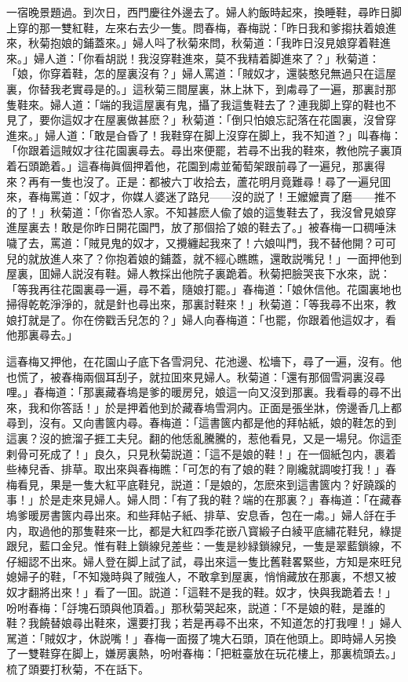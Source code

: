 一宿晚景題過。到次日，西門慶往外邊去了。婦人約飯時起來，換睡鞋，尋昨日脚上穿的那一雙紅鞋，左來右去少一隻。問春梅，春梅説：「昨日我和爹搊扶着娘進來，秋菊抱娘的鋪蓋來。」婦人呌了秋菊來問，秋菊道：「我昨日沒見娘穿着鞋進來。」婦人道：「你看胡説！我沒穿鞋進來，莫不我精着脚進來了？」秋菊道：「娘，你穿着鞋，怎的屋裏沒有？」婦人罵道：「賊奴才，還裝憨兒無過只在這屋裏，你替我老實尋是的。」這秋菊三間屋裏，牀上牀下，到䖏尋了一遍，那裏討那隻鞋來。婦人道：「端的我這屋裏有鬼，攝了我這隻鞋去了？連我脚上穿的鞋也不見了，要你這奴才在屋裏做甚麽？」秋菊道：「倒只怕娘忘記落在花園裏，沒曾穿進來。」婦人道：「敢是㒲昏了！我鞋穿在脚上沒穿在脚上，我不知道？」叫春梅：「你跟着這賊奴才往花園裏尋去。尋出來便罷，若尋不出我的鞋來，教他院子裏頂着石頭跪着。」這春梅眞個押着他，花園到䖏並葡萄架跟前尋了一遍兒，那裏得來？再有一隻也沒了。正是：都被六丁收拾去，蘆花明月竟難尋！尋了一遍兒囬來，春梅罵道：「奴才，你媒人婆迷了路兒——沒的説了！王嬤嬤賣了磨——推不的了！」秋菊道：「你省恐人家。不知甚麽人偸了娘的這隻鞋去了，我沒曾見娘穿進屋裏去！敢是你昨日開花園門，放了那個拾了娘的鞋去了。」被春梅一口稠唾沬噦了去，罵道：「賊見鬼的奴才，又攪纏起我來了！六娘叫門，我不替他開？可可兒的就放進人來了？你抱着娘的鋪蓋，就不經心瞧瞧，還敢説嘴兒！」一面押他到屋裏，囬婦人説沒有鞋。婦人教採出他院子裏跪着。秋菊把臉哭丧下水來，説：「等我再往花園裏尋一遍，尋不着，隨娘打罷。」春梅道：「娘休信他。花園裏地也掃得乾乾淨淨的，就是針也尋出來，那裏討鞋來！」秋菊道：「等我尋不出來，教娘打就是了。你在傍戳舌兒怎的？」婦人向春梅道：「也罷，你跟着他這奴才，看他那裏尋去。」

這春梅又押他，在花園山子底下各雪洞兒、花池邊、松墻下，尋了一遍，沒有。他也慌了，被春梅兩個耳刮子，就拉囬來見婦人。秋菊道：「還有那個雪洞裏沒尋哩。」春梅道：「那裏藏春塢是爹的暖房兒，娘這一向又沒到那裏。我看尋的尋不出來，我和你答話！」於是押着他到於藏春塢雪洞内。正面是張坐牀，傍邊香几上都尋到，沒有。又向書篋内尋。春梅道：「這書篋内都是他的拜帖紙，娘的鞋怎的到這裏？沒的摭溜子捱工夫兒。翻的他恁亂騰騰的，惹他看見，又是一場兒。你這歪剌骨可死成了！」良久，只見秋菊説道：「這不是娘的鞋！」在一個紙包内，裹着些棒兒香、排草。取出來與春梅瞧：「可怎的有了娘的鞋？剛纔就調唆打我！」春梅看見，果是一隻大紅平底鞋兒，説道：「是娘的，怎麽來到這書篋内？好蹺蹊的事！」於是走來見婦人。婦人問：「有了我的鞋？端的在那裏？」春梅道：「在藏春塢爹暖房書篋内尋出來。和些拜帖子紙、排草、安息香，包在一䖏。」婦人㧱在手内，取過他的那隻鞋來一比，都是大紅四季花嵌八寳緞子白綾平底繡花鞋兒，綠提跟兒，藍口金兒。惟有鞋上鎖線兒差些：一隻是紗緑鎖線兒，一隻是翠藍鎖線，不仔細認不出來。婦人登在脚上試了試，尋出來這一隻比舊鞋畧緊些，方知是來旺兒媳婦子的鞋，「不知幾時與了賊強人，不敢拿到屋裏，悄悄藏放在那裏，不想又被奴才翻將出來！」看了一囬。説道：「這鞋不是我的鞋。奴才，快與我跪着去！」吩咐春梅：「㧱塊石頭與他頂着。」那秋菊哭起來，説道：「不是娘的鞋，是誰的鞋？我饒替娘尋出鞋來，還要打我；若是再尋不出來，不知道怎的打我哩！」婦人駡道：「賊奴才，休説嘴！」春梅一面掇了塊大石頭，頂在他頭上。即時婦人另換了一雙鞋穿在脚上，嫌房裏熱，吩咐春梅：「把粧臺放在玩花樓上，那裏梳頭去。」梳了頭要打秋菊，不在話下。


